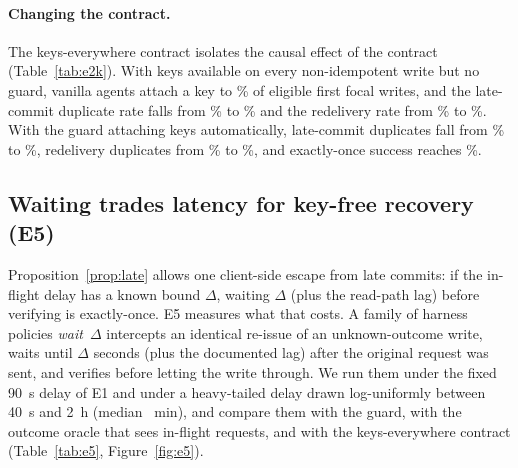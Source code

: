 \paragraph{Changing the contract.} The keys-everywhere contract isolates the causal effect of the contract
(Table~\ref{tab:e2k}). With keys available on every non-idempotent write but no guard, vanilla agents attach a key
to \EKeysVanillaKeyUse{}\% of eligible first focal writes, and the late-commit duplicate rate falls from \ENativeVanillaLate{}\%
to \EKeysVanillaLate{}\% and the redelivery rate from \ENativeVanillaRedeliv{}\% to \EKeysVanillaRedeliv{}\%. With the
guard attaching keys automatically, late-commit duplicates fall from \ENativeGuardLate{}\% to \EKeysGuardLate{}\%,
redelivery duplicates from \ENativeGuardRedeliv{}\% to \EKeysGuardRedeliv{}\%, and exactly-once success reaches
\EKeysGuardEOS{}\%.

\begin{table}[t]
\centering
\scriptsize
\caption{Duplicate rate (\%) by contract variant and condition under committed faults and redelivery (E2, E2k;
three models pooled).}
\label{tab:e2k}

\end{table}

\subsection{Waiting trades latency for key-free recovery (E5)}
\label{sec:e5}

Proposition~\ref{prop:late} allows one client-side escape from late commits: if the in-flight delay has a known
bound $\Delta$, waiting $\Delta$ (plus the read-path lag) before verifying is exactly-once. E5 measures what that
costs. A family of harness policies \emph{wait~$\Delta$} intercepts an identical re-issue of an unknown-outcome
write, waits until $\Delta$ seconds (plus the documented lag) after the original request was sent, and verifies
before letting the write through. We run them under the fixed 90~s delay of E1 and under a heavy-tailed delay
drawn log-uniformly between 40~s and 2~h (median \EFiveTailMedian{}~min), and compare them with the guard, with
the outcome oracle that sees in-flight requests, and with the keys-everywhere contract (Table~\ref{tab:e5},
Figure~\ref{fig:e5}).

\begin{table}[t]
\centering
\scriptsize
\caption{Waiting versus keys under late commits (E5; three models, all focal writes of instance 0). ``time'' is the
mean agent-visible episode time in simulated minutes; $P(\delta\le\Delta)$ is the fraction of tail-delay worlds whose
in-flight delay does not exceed the assumed bound. Fixed-delay rows for vanilla, guard, both oracles and the keys
contract are the matched E2/E2k episodes.}
\label{tab:e5}

\end{table}

